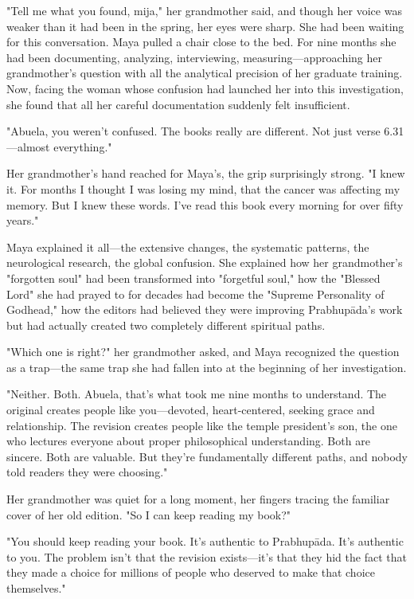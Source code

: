 \documentclass[12pt,twoside]{book}
\begin{document}
"Tell me what you found, mija," her grandmother said, and though her voice was weaker than it had been in the spring, her eyes were sharp. She had been waiting for this conversation.
Maya pulled a chair close to the bed. For nine months she had been documenting, analyzing, interviewing, measuring—approaching her grandmother's question with all the analytical precision of her graduate training. Now, facing the woman whose confusion had launched her into this investigation, she found that all her careful documentation suddenly felt insufficient.

"Abuela, you weren't confused. The books really are different. Not just verse 6.31—almost everything."

Her grandmother's hand reached for Maya's, the grip surprisingly strong. "I knew it. For months I thought I was losing my mind, that the cancer was affecting my memory. But I knew these words. I've read this book every morning for over fifty years."

Maya explained it all—the extensive changes, the systematic patterns, the neurological research, the global confusion. She explained how her grandmother's "forgotten soul" had been transformed into "forgetful soul," how the "Blessed Lord" she had prayed to for decades had become the "Supreme Personality of Godhead," how the editors had believed they were improving Prabhupāda's work but had actually created two completely different spiritual paths.

"Which one is right?" her grandmother asked, and Maya recognized the question as a trap—the same trap she had fallen into at the beginning of her investigation.

"Neither. Both. Abuela, that's what took me nine months to understand. The original creates people like you—devoted, heart-centered, seeking grace and relationship. The revision creates people like the temple president's son, the one who lectures everyone about proper philosophical understanding. Both are sincere. Both are valuable. But they're fundamentally different paths, and nobody told readers they were choosing."

Her grandmother was quiet for a long moment, her fingers tracing the familiar cover of her old edition. "So I can keep reading my book?"

"You should keep reading your book. It's authentic to Prabhupāda. It's authentic to you. The problem isn't that the revision exists—it's that they hid the fact that they made a choice for millions of people who deserved to make that choice themselves."
\end{document}

